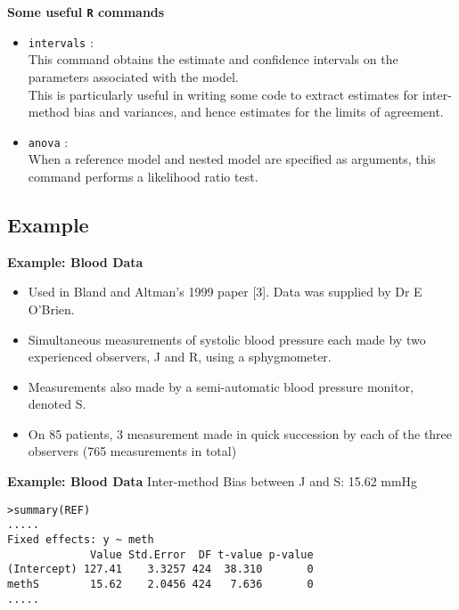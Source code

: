 \documentclass[compress]{beamer}        %
\makeatletter
\newcommand{\tcb}{\textcolor{beamer@blendedblue}}
\makeatother
\begin{document}
\begin{frame}{\bf \tcb{Some useful \texttt{R} commands}}
\large
\vspace{-0.7cm}
\begin{itemize}

\item \texttt{intervals} :\vspace{0.25cm} \\This command obtains the estimate and confidence intervals on the parameters associated with the model.\\
    This is particularly useful in writing some code to extract estimates for inter-method bias and variances, and hence estimates for the limits of agreement.

\item \texttt{anova} : \vspace{0.25cm} \\When a reference model and nested model are specified as arguments, this command performs a likelihood ratio test.
\end{itemize}
\end{frame}

\subsection{Example}
\begin{frame}{\bf \tcb{Example: Blood Data}}
\begin{itemize}\itemsep0.5cm
\item Used in Bland and Altman's 1999 paper [3]. Data was supplied by Dr E O'Brien.
\item Simultaneous measurements of systolic blood pressure each made by two experienced observers, J and R, using a  sphygmometer.
\item Measurements also made by a semi-automatic blood pressure monitor, denoted S.
\item On 85 patients, 3 measurement made in quick succession by each of the three observers (765 measurements in total)
\end{itemize}
\end{frame}

\begin{frame}[fragile]{\bf \tcb{Example: Blood Data}}
Inter-method Bias between J and S:         15.62 mmHg
\begin{verbatim}
>summary(REF)
.....
Fixed effects: y ~ meth
             Value Std.Error  DF t-value p-value
(Intercept) 127.41    3.3257 424  38.310       0
methS        15.62    2.0456 424   7.636       0
.....
\end{verbatim}
\end{frame}
\end{document}
